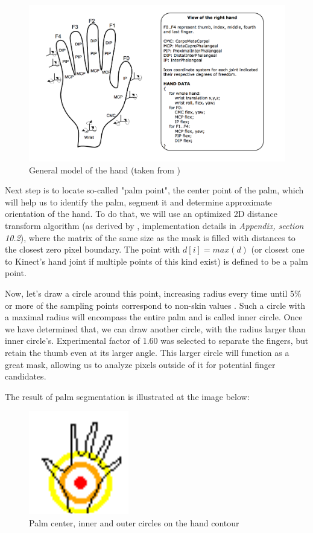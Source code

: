 \documentclass[a4paper,11pt,oneside]{article}
\begin{document}
\begin{figure}[H]
\centering
\includegraphics[scale=0.47]{hand-dof.png}
\caption{General model of the hand (taken from \cite{OT01})}
\end{figure}

Next step is to locate so-called "palm point", the center point of the palm, which will help us to identify the palm, segment it and determine approximate orientation of the hand. To do that, we will use an optimized 2D distance transform algorithm (as derived by \cite{DT01}, implementation details in \textit{Appendix, section 10.2}), where the matrix of the same size as the mask is filled with distances to the closest zero pixel boundary. The point with $d[i] = max(d)$ (or closest one to Kinect's hand joint if multiple points of this kind exist) is defined to be a palm point.

Now, let's draw a circle around this point, increasing radius every time until 5\% or more of the sampling points correspond to non-skin values . Such a circle with a maximal radius will encompass the entire palm and is called inner circle. Once we have determined that, we can draw another circle, with the radius larger than inner circle's. Experimental factor of 1.60 was selected to separate the fingers, but retain the thumb even at its larger angle. This larger circle will function as a great mask, allowing us to analyze pixels outside of it for potential finger candidates.

The result of palm segmentation is illustrated at the image below:\\

\begin{figure}[H]
\centering
\includegraphics[scale=1.5]{hand-circles.png}
\caption{Palm center, inner and outer circles on the hand contour}
\end{figure}
\end{document}
